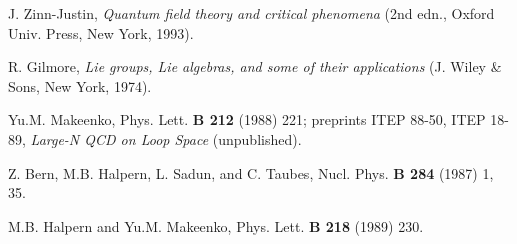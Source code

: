 \documentclass[a4paper,12pt]{article}
\begin{document}
\begin{thebibliography}{99}
J. Zinn-Justin,
{\it Quantum field theory and critical phenomena} (2nd edn., Oxford Univ. Press,
New York, 1993).

R. Gilmore, {\it Lie groups, Lie algebras, and some of their applications}
(J. Wiley \& Sons, New York, 1974).

Yu.M. Makeenko, Phys. Lett. {\bf B 212} (1988) 221; preprints ITEP 88-50, ITEP 18-89,
{\it Large-N QCD on Loop Space} (unpublished).

Z. Bern, M.B. Halpern, L. Sadun, and C. Taubes, Nucl. Phys. {\bf B 284} (1987) 1, 35.

M.B. Halpern and Yu.M. Makeenko, Phys. Lett. {\bf B 218} (1989) 230.

\end{thebibliography}
\end{document}
